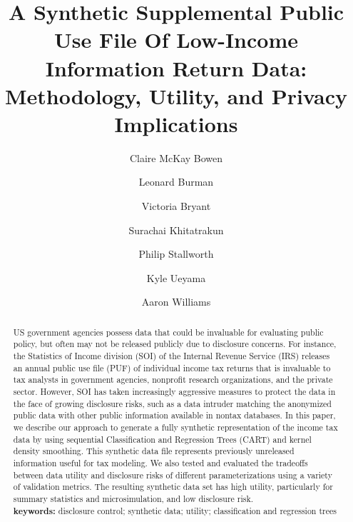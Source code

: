\documentclass[11pt,runningheads,oribibl]{llncs}
\begin{document}
%
\title{A Synthetic Supplemental Public Use File Of Low-Income Information Return Data: Methodology, Utility, and Privacy Implications}
%

\author{Claire McKay Bowen \and %
Leonard Burman  \and
Victoria Bryant  \and
Surachai Khitatrakun \and
Philip Stallworth \and
Kyle Ueyama \and
Aaron Williams
}
%
%
%
\maketitle              %
%
\begin{abstract}
    US government agencies possess data that could be invaluable for evaluating public policy, but often may not be released publicly due to disclosure concerns. For instance, the Statistics of Income division (SOI) of the Internal Revenue Service (IRS) releases an annual public use file (PUF) of individual income tax returns that is invaluable to tax analysts in government agencies, nonprofit research organizations, and the private sector. However, SOI has taken increasingly aggressive measures to protect the data in the face of growing disclosure risks, such as a data intruder matching the anonymized public data with other public information available in nontax databases. In this paper, we describe our approach to generate a fully synthetic representation of the income tax data by using sequential Classification and Regression Trees (CART) and kernel density smoothing. This synthetic data file represents previously unreleased information useful for tax modeling. We also tested and evaluated the tradeoffs between data utility and disclosure risks of different parameterizations using a variety of validation metrics. The resulting synthetic data set has high utility, particularly for summary statistics and microsimulation, and low disclosure risk.\\
    
    \textbf{keywords:} disclosure control; synthetic data; utility; classification and regression trees
\end{abstract}
\end{document}
